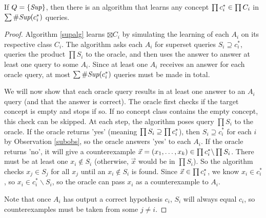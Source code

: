 \begin{proposition}

If $Q = \{ \supQ \}$, then there is an algorithm that learns any concept $\targ \in \prod C_i $ in $\sum \supCi{i}(c^*_i)$ queries.  
\end{proposition}
\begin{proof}
Algorithm \ref{supalg} learns $\boxtimes C_i $ by simulating the learning of each $A_i$ on its respective class $C_i$. 
The algorithm asks each $A_i$ for superset queries $S_i \supseteq c_i^*$, queries the product $\prod S_i$ to the oracle, and then uses the answer to answer at least one query to some $A_i$. 
Since at least one $A_i$ receives an answer for each oracle query, at most $\sum \supCi{i}(c^*_i)$ queries must be made in total. 

 

We will now show that each oracle query results in at least one answer to an $A_i$ query (and that the answer is correct). 
The oracle first checks if the target concept is empty and stops if so.
If no concept class contains the empty concept, this check can be skipped. 
At each step, the algorithm poses query $\prod S_i$ to the oracle. 
If the oracle returns 'yes' (meaning $\prod S_i \supseteq \targ$), then  $S_i \supseteq c_i^*$ for each $i$ by Observation \ref{subobs}, so the oracle answers 'yes' to each $A_i$. 
If the oracle returns 'no', it will give a counterexample $\vec{x} = (x_1,\dots,x_k) \in \targ \backslash \prod S_i$. 
There must be at least one $x_i \not\in S_i$ (otherwise, $\vec{x}$ would be in $\prod S_i$). 
So the algorithm checks $x_j \in S_j$ for all $x_j$ until an $x_i \not\in S_i$ is found. 
Since $\vec{x} \in \targ$, we know $x_i \in c_i^*$, so $x_i \in c_i^* \backslash S_i$, so the oracle can pass $x_i$ as a counterexample to $A_i$. 

Note that once $A_i$ has output a correct hypothesis $c_i$, $S_i$ will always equal $c_i$, so counterexamples must be taken from some $j \ne i$. 
\end{proof}





